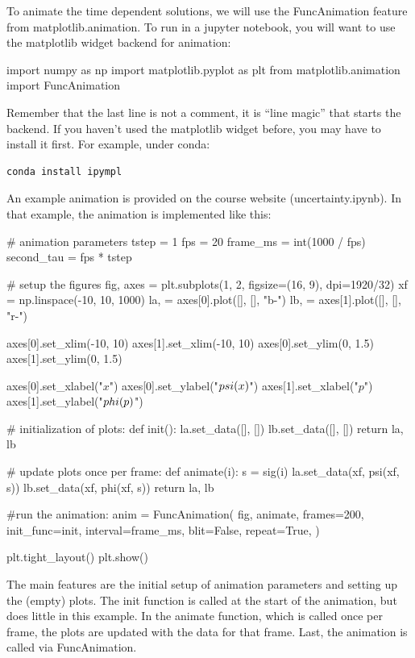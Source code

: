 \documentclass[12pt]{article}
\begin{document}
To animate the time dependent solutions, we will use the FuncAnimation
feature from matplotlib.animation.  To run in a jupyter notebook, you
will want to use the matplotlib widget backend for animation:
\begin{python}
import numpy as np
import matplotlib.pyplot as plt
from matplotlib.animation import FuncAnimation
\end{python}
Remember that the last line is not a comment, it is ``line magic''
that starts the backend.  If you haven't used the matplotlib widget
before, you may have to install it first.  For example, under conda:
\begin{verbatim}
conda install ipympl
\end{verbatim}
An example animation is provided on the course website (uncertainty.ipynb). In that example, the animation is implemented like this:
\begin{python}
# animation parameters
tstep = 1
fps = 20
frame_ms = int(1000 / fps)
second_tau = fps * tstep

# setup the figures
fig, axes = plt.subplots(1, 2, figsize=(16, 9), dpi=1920/32)
xf = np.linspace(-10, 10, 1000)
la, = axes[0].plot([], [], "b-")
lb, = axes[1].plot([], [], "r-")

axes[0].set_xlim(-10, 10)
axes[1].set_xlim(-10, 10)
axes[0].set_ylim(0, 1.5)
axes[1].set_ylim(0, 1.5)

axes[0].set_xlabel("$x$")
axes[0].set_ylabel("$\\psi(x)$")
axes[1].set_xlabel("$p$")
axes[1].set_ylabel("$\\phi(p)$")

# initialization of plots:
def init():
    la.set_data([], [])
    lb.set_data([], [])
    return la, lb

# update plots once per frame:
def animate(i):
    s = sig(i)
    la.set_data(xf, psi(xf, s))
    lb.set_data(xf, phi(xf, s))
    return la, lb

#run the animation:
anim = FuncAnimation(
    fig,
    animate,
    frames=200,
    init_func=init,
    interval=frame_ms,
    blit=False,
    repeat=True,
)

plt.tight_layout()
plt.show()
\end{python}
The main features are the initial setup of animation parameters and
setting up the (empty) plots.  The init function is called at the
start of the animation, but does little in this example.  In the
animate function, which is called once per frame, the plots are
updated with the data for that frame.  Last, the animation is called
via FuncAnimation.
\end{document}
